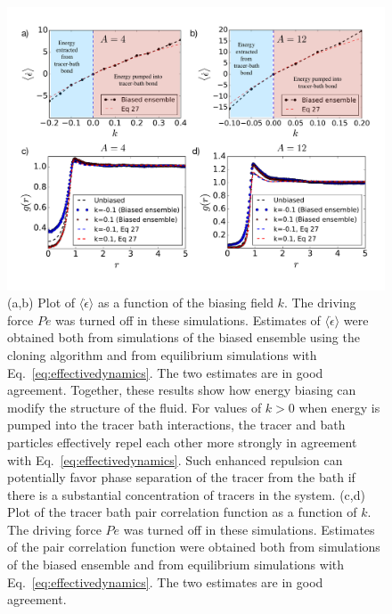\documentclass[pre, superscriptaddress, twocolumn,pre]{revtex4-1}
\begin{document}
\begin{figure}
	\centering
	\includegraphics[width=0.99\linewidth]{Fig3Full.pdf}
	\caption{\label{fig:energybias}
		(a,b) Plot of $\langle\dot{\epsilon}\rangle$ as a function of the biasing field $k$. The driving force $Pe$ was turned off in these simulations.  Estimates of $\langle\dot{\epsilon}\rangle$ were obtained both from simulations of the biased ensemble using the cloning algorithm and from equilibrium simulations with Eq.~\ref{eq:effectivedynamics}. The two estimates are in good agreement. Together, these results show how energy biasing can modify the structure of the fluid. For values of $k>0$ when energy is pumped into the tracer bath interactions, the tracer and bath particles effectively repel each other more strongly in agreement with Eq.~\ref{eq:effectivedynamics}. Such enhanced repulsion can potentially favor phase separation of the tracer from the bath if there is a substantial concentration of tracers in the system.
		(c,d) Plot of the tracer bath pair correlation function as a function of $k$. The driving force $Pe$ was turned off in these simulations. Estimates of the pair correlation function were obtained both from simulations of the biased ensemble and from equilibrium simulations with Eq.~\ref{eq:effectivedynamics}. The two estimates are in good agreement. }
\end{figure}
\end{document}
